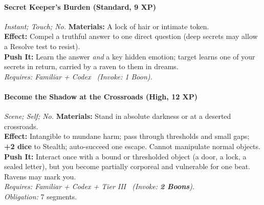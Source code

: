 \paragraph{Secret Keeper’s Burden (Standard, 9 XP)} \emph{Instant; Touch; No.}
\textbf{Materials:} A lock of hair or intimate token.\\
\textbf{Effect:} Compel a truthful answer to one direct question (deep secrets may allow a Resolve test to resist).\\
\textbf{Push It:} Learn the answer \emph{and} a key hidden emotion; target learns one of your secrets in return, carried by a raven to them in dreams.\\
\emph{Requires: Familiar + Codex \ (\textit{Invoke:} 1 Boon).}

\paragraph{Become the Shadow at the Crossroads (High, 12 XP)} \emph{Scene; Self; No.}
\textbf{Materials:} Stand in absolute darkness or at a deserted crossroads.\\
\textbf{Effect:} Intangible to mundane harm; pass through thresholds and small gaps; \textbf{+2 dice} to Stealth; auto-succeed one escape. Cannot manipulate normal objects.\\
\textbf{Push It:} Interact once with a bound or thresholded object (a door, a lock, a sealed letter), but you become partially corporeal and vulnerable for one beat. Ravens may mark you.\\
\emph{Requires: Familiar + Codex + Tier III \ (\textit{Invoke:} \textbf{2 Boons}).}\\
\emph{Obligation:} 7 segments.
